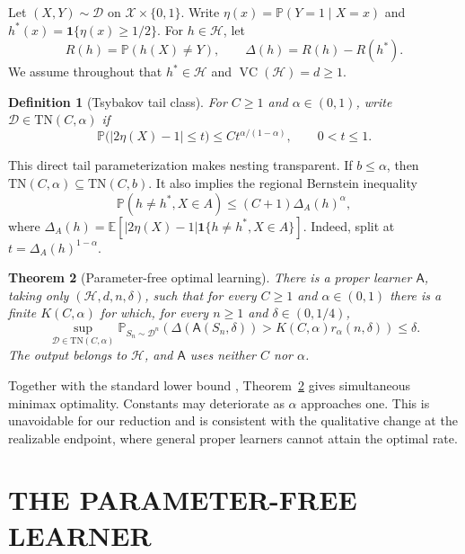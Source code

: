 \documentclass[twoside]{article}
\newtheorem{theorem}{Theorem}
\newtheorem{definition}[theorem]{Definition}
\newcommand{\Hc}{\mathcal H}
\newcommand{\D}{\mathcal D}
\newcommand{\E}{\mathbb E}
\newcommand{\Pp}{\mathbb P}
\newcommand{\one}{\mathbf 1}
\newcommand{\Risk}{R}
\newcommand{\Ex}{\Delta}
\begin{document}
Let $(X,Y)\sim\D$ on $\mathcal X\times\{0,1\}$. Write $\eta(x)=\Pp(Y=1\mid X=x)$ and $h^*(x)=\one\{\eta(x)\geq1/2\}$. For $h\in\Hc$, let \[ \Risk(h)=\Pp(h(X)\ne Y),\qquad \Ex(h)=\Risk(h)-\Risk(h^*). \] We assume throughout that $h^*\in\Hc$ and $\operatorname{VC}(\Hc)=d\geq1$.

\begin{definition}[Tsybakov tail class]
\label{def:tn}
For $C\geq1$ and $\alpha\in(0,1)$, write $\D\in\mathrm{TN}(C,\alpha)$ if
\begin{equation}
 \Pp\bigl(|2\eta(X)-1|\leq t\bigr)
 \leq C t^{\alpha/(1-\alpha)},\qquad 0<t\leq1.
 \label{eq:tn}
\end{equation}
\end{definition}

This direct tail parameterization makes nesting transparent. If $b\leq\alpha$, then $\mathrm{TN}(C,\alpha)\subseteq\mathrm{TN}(C,b)$. It also implies the regional Bernstein inequality
\begin{equation}
 \Pp(h\ne h^*,X\in A)
 \leq(C+1)\Ex_A(h)^\alpha,
 \label{eq:regional-bernstein}
\end{equation}
where $\Ex_A(h)=\E[|2\eta(X)-1|\one\{h\ne h^*,X\in A\}]$. Indeed, split at $t=\Ex_A(h)^{1-\alpha}$.

\begin{theorem}[Parameter-free optimal learning]
\label{thm:main}
There is a proper learner $\mathsf A$, taking only $(\Hc,d,n,\delta)$, such that for every $C\geq1$ and $\alpha\in(0,1)$ there is a finite $K(C,\alpha)$ for which, for every $n\geq1$ and $\delta\in(0,1/4)$,
\begin{equation}
 \sup_{\D\in\mathrm{TN}(C,\alpha)}
 \Pp_{S_n\sim\D^n}\!\left(
 \Ex(\mathsf A(S_n,\delta))>K(C,\alpha)r_\alpha(n,\delta)
 \right)
 \leq\delta.
 \label{eq:main}
\end{equation}
The output belongs to $\Hc$, and $\mathsf A$ uses neither $C$ nor $\alpha$.
\end{theorem}

Together with the standard lower bound \citep{massart2006risk,hanneke2015minimax}, Theorem~\ref{thm:main} gives simultaneous minimax optimality. Constants may deteriorate as $\alpha$ approaches one. This is unavoidable for our reduction and is consistent with the qualitative change at the realizable endpoint, where general proper learners cannot attain the optimal rate.

\section{THE PARAMETER-FREE LEARNER}
\label{sec:algorithm}
\end{document}
